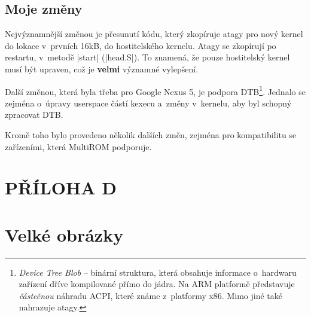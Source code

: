 \documentclass[12pt, a4paper, oneside]{article}
\newcommand{\B}{\textbf} %
\newcommand{\It}{\textit}  %
\begin{document}
\subsection*{Moje změny}
Nejvýznamnější změnou je přesunutí kódu, který zkopíruje atagy pro nový kernel do lokace v~prvních 16kB, do hostitelského kernelu. Atagy se zkopírují po restartu, v~metodě |start| (|head.S|). To znamená, že pouze hostitelský kernel musí být upraven, což je \B{velmi} významné vylepšení.

Další změnou, která byla třeba pro Google Nexus 5, je podpora DTB\footnote{\It{Device Tree Blob} -- binární struktura, která obsahuje informace o~hardwaru zařízení dříve kompilované přímo do jádra. Na ARM platformě představuje \It{částečnou} náhradu ACPI, které známe z~platformy x86. Mimo jiné také nahrazuje atagy.}. Jednalo se zejména o~úpravy userspace částí kexecu a~změny v~kernelu, aby byl schopný zpracovat DTB.

Kromě toho bylo provedeno několik dalších změn, zejména pro kompatibilitu se zařízeními, která MultiROM podporuje.


\newpage
\voffset=-70pt
\addtolength{\textheight}{70pt}
\addtolength{\footskip}{70pt}
 \section*{PŘÍLOHA D}
 \section*{Velké obrázky}
 \label{obrazky}
\end{document}
